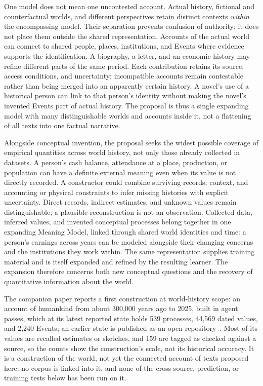 \documentclass[10pt]{article}
\begin{document}
One model does not mean one uncontested account. Actual history, fictional and
counterfactual worlds, and different perspectives retain distinct contexts
\emph{within} the encompassing model. Their separation prevents confusion of
authority; it does not place them outside the shared representation. Accounts
of the actual world can connect to shared people, places,
institutions, and Events where evidence supports the identification. A
biography, a letter, and an economic history may refine different parts of the
same period. Each contribution retains its source, access conditions, and
uncertainty; incompatible accounts remain contestable rather than being
merged into an apparently certain history. A novel's use of a historical person
can link to that person's identity without making the novel's invented Events
part of actual history. The proposal is thus a single expanding model with
many distinguishable worlds and accounts inside it, not a flattening of all
texts into one factual narrative.

Alongside conceptual invention, the proposal seeks the widest possible
coverage of empirical quantities across world history, not only those already
collected in datasets. A person's cash balance, attendance at a place,
production, or population can have a definite external meaning even when its
value is not directly recorded. A constructor could combine surviving records,
context, and accounting or physical constraints to infer missing histories
with explicit uncertainty. Direct records, indirect estimates, and unknown
values remain distinguishable; a plausible reconstruction is not an
observation. Collected data, inferred values, and invented conceptual
processes belong together in one expanding Meaning Model, linked through
shared world identities and time: a person's earnings across years can be
modeled alongside their changing concerns and the institutions they work
within. The same representation supplies training material and is itself
expanded and refined by the resulting learner. The expansion therefore
concerns both new conceptual questions and the recovery of quantitative
information about the world.

The companion paper reports a first construction at world-history scope: an
account of humankind from about 300,000 years ago to 2025, built in agent
passes, which at its latest reported state holds 539 processes, 44,569 dated
values, and 2,240 Events; an earlier state is published as an open
repository~\cite{westerbergMeaning2026}. Most of its values are recalled
estimates or sketches, and 159 are tagged as checked against a source, so the
counts show the construction's scale, not its historical accuracy. It is a
construction of the world, not yet the connected account of texts proposed here: no corpus is linked into it,
and none of the cross-source, prediction, or training tests below has been run
on it.
\end{document}
